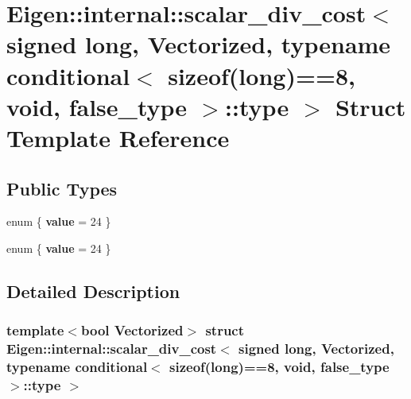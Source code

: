 \hypertarget{struct_eigen_1_1internal_1_1scalar__div__cost_3_01signed_01long_00_01_vectorized_00_01typename_0928d7226c6d88e74072f0f5e87ecaa67}{}\section{Eigen\+:\+:internal\+:\+:scalar\+\_\+div\+\_\+cost$<$ signed long, Vectorized, typename conditional$<$ sizeof(long)==8, void, false\+\_\+type $>$\+:\+:type $>$ Struct Template Reference}
\label{struct_eigen_1_1internal_1_1scalar__div__cost_3_01signed_01long_00_01_vectorized_00_01typename_0928d7226c6d88e74072f0f5e87ecaa67}
\subsection*{Public Types}
\begin{DoxyCompactItemize}
\item 
\mbox{\label{struct_eigen_1_1internal_1_1scalar__div__cost_3_01signed_01long_00_01_vectorized_00_01typename_0928d7226c6d88e74072f0f5e87ecaa67_a66afa7ff96950369654ba8157deed070}} 
enum \{ {\bfseries value} = 24
 \}
\item 
\mbox{\label{struct_eigen_1_1internal_1_1scalar__div__cost_3_01signed_01long_00_01_vectorized_00_01typename_0928d7226c6d88e74072f0f5e87ecaa67_a3f8cd03bb3e0b4dcf3b559814d67997d}} 
enum \{ {\bfseries value} = 24
 \}
\end{DoxyCompactItemize}


\subsection{Detailed Description}
\subsubsection*{template$<$bool Vectorized$>$\newline
struct Eigen\+::internal\+::scalar\+\_\+div\+\_\+cost$<$ signed long, Vectorized, typename conditional$<$ sizeof(long)==8, void, false\+\_\+type $>$\+::type $>$}



